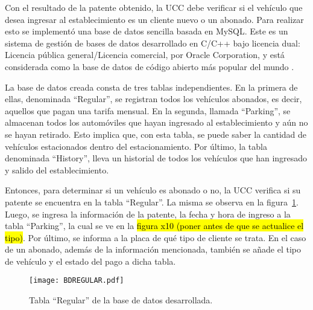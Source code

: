 Con el resultado de la patente obtenido, la UCC debe verificar si el vehículo que desea ingresar al establecimiento es un cliente nuevo o un abonado. Para realizar esto se implementó una base de datos sencilla basada en MySQL. Este es un sistema de gestión de bases de datos desarrollado en C/C++ bajo licencia dual: Licencia pública general/Licencia comercial, por Oracle Corporation, y está considerada como la base de datos de código abierto más popular del mundo \cite{mysql}.

La base de datos creada consta de tres tablas independientes. En la primera de ellas, denominada ``Regular'', se registran todos los vehículos abonados, es decir, aquellos que pagan una tarifa mensual. En la segunda, llamada ``Parking'', se almacenan todos los automóviles que hayan ingresado al establecimiento y aún no se hayan retirado. Esto implica que, con esta tabla, se puede saber la cantidad de vehículos estacionados dentro del estacionamiento. Por último, la tabla denominada ``History'', lleva un historial de todos los vehículos que han ingresado y salido del establecimiento.

Entonces, para determinar si un vehículo es abonado o no, la UCC verifica si su patente se encuentra en la tabla ``Regular''. La misma se observa en la figura~\ref{fig:img_BDREGULAR}. Luego, se ingresa la información de la patente, la fecha y hora de ingreso a la tabla ``Parking'', la cual se ve en la \hl{figura x10 (poner antes de que se actualice el tipo)}. Por último, se informa a la placa de qué tipo de cliente se trata. En el caso de un abonado, además de la información mencionada, también se añade el tipo de vehículo y el estado del pago a dicha tabla.

\begin{figure}[H]
	\centering
	\texttt{[image: BDREGULAR.pdf]}
	\caption{Tabla ``Regular'' de la base de datos desarrollada.}
	\label{fig:img_BDREGULAR}
\end{figure}


